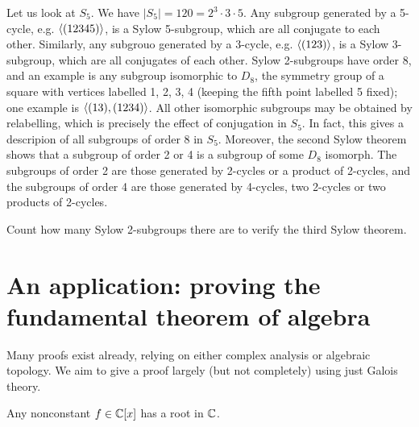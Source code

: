 \begin{example}
    Let us look at $S_5$. We have $|S_5| = 120 = 2^3 \cdot 3 \cdot 5$. Any subgroup generated by a 5-cycle, e.g. $\langle {(12345)} \rangle$, is a Sylow 5-subgroup, which are all conjugate to each other. Similarly, any subgrouo generated by a 3-cycle, e.g. $\langle {(123)} \rangle$, is a Sylow 3-subgroup, which are all conjugates of each other. Sylow 2-subgroups have order 8, and an example is any subgroup isomorphic to $D_8$, the symmetry group of a square with vertices labelled 1, 2, 3, 4 (keeping the fifth point labelled 5 fixed); one example is $\langle {(13), (1234)} \rangle$. All other isomorphic subgroups may be obtained by relabelling, which is precisely the effect of conjugation in $S_5$. In fact, this gives a descripion of all subgroups of order 8 in $S_5$. Moreover, the second Sylow theorem shows that a subgroup of order 2 or 4 is a subgroup of some $D_8$ isomorph. The subgroups of order 2 are those generated by 2-cycles or a product of 2-cycles, and the subgroups of order 4 are those generated by 4-cycles, two 2-cycles or two products of 2-cycles.
\end{example}

\begin{exercise}
    Count how many Sylow 2-subgroups there are to verify the third Sylow theorem.
\end{exercise}

\section{An application: proving the fundamental theorem of algebra}

Many proofs exist already, relying on either complex analysis or algebraic topology. We aim to give a proof largely (but not completely) using just Galois theory.

\begin{theorem}
    Any nonconstant $f \in \mathbb{{C}}[x]$ has a root in $\mathbb{{C}}$.
\end{theorem}

